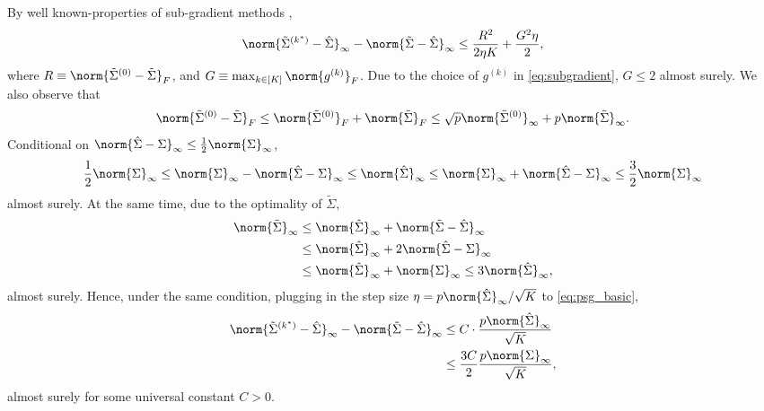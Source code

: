 \documentclass[aos]{imsart}
\begin{document}
\begin{appendix}
By well known-properties of sub-gradient methods \citep[see, e.g.][Section 2]{boyd2003subgradient}, 
\begin{equation} \label{eq:psg_basic}
    \norm{\tilde\Sigma^{(k^*)} - \hat\Sigma}_\infty - \norm{\tilde\Sigma - \hat\Sigma}_\infty 
    \leq \frac{R^2}{2 \eta K} + \frac{G^2 \eta}{2},
\end{equation}
where $R \equiv \norm{\tilde\Sigma^{(0)} - \tilde\Sigma}_F$, and $G \equiv \max_{k \in [K]} \norm{g^{(k)}}_F$. Due to the choice of $g^{(k)}$ in \cref{eq:subgradient}, $G \leq 2$ almost surely. 
%
We also observe that
\begin{equation*}
    \norm{\tilde\Sigma^{(0)} - \tilde\Sigma}_F
    \leq \norm{\tilde\Sigma^{(0)}}_F + \norm{\tilde\Sigma}_F
    \leq \sqrt{p} \norm{\tilde\Sigma^{(0)}}_\infty + p \norm{\tilde\Sigma}_\infty.
\end{equation*}
Conditional on $\norm{\hat\Sigma - \Sigma}_\infty \leq \frac{1}{2} \norm{\Sigma}_\infty$, 
\begin{equation*}
\begin{aligned}
    \frac{1}{2} \norm{\Sigma}_\infty
    \leq \norm{\Sigma}_\infty - \norm{\hat\Sigma - \Sigma}_\infty
    \leq \norm{\hat\Sigma}_\infty 
    \leq \norm{\Sigma}_\infty + \norm{\hat\Sigma - \Sigma}_\infty
    \leq \frac{3}{2} \norm{\Sigma}_\infty 
\end{aligned}
\end{equation*}
almost surely. At the same time, due to the optimality of $\tilde\Sigma$,
\begin{equation*}
\begin{aligned}
    \norm{\tilde\Sigma}_\infty 
    & \leq \norm{\hat\Sigma}_\infty + \norm{\tilde\Sigma - \hat\Sigma}_\infty \\
    & \leq \norm{\hat\Sigma}_\infty + 2 \norm{\hat\Sigma - \Sigma}_\infty \\
    & \leq \norm{\hat\Sigma}_\infty + \norm{\Sigma}_\infty
    \leq 3 \norm{\hat\Sigma}_\infty,
\end{aligned}
\end{equation*}
almost surely. Hence, under the same condition, plugging in the step size $\eta = p\norm{\hat\Sigma}_\infty / \sqrt{K}$ to \cref{eq:psg_basic},
\begin{equation*}
\begin{aligned}
    \norm{\tilde\Sigma^{(k^*)} - \hat\Sigma}_\infty - \norm{\tilde\Sigma - \hat\Sigma}_\infty 
    & \leq C \cdot \frac{p \norm{\hat\Sigma}_\infty}{\sqrt{K}} \\
    & \leq \frac{3C}{2} \frac{p \norm{\Sigma}_\infty}{\sqrt{K}},
\end{aligned}
\end{equation*}
almost surely for some universal constant $C > 0$.


\end{appendix}
\end{document}
